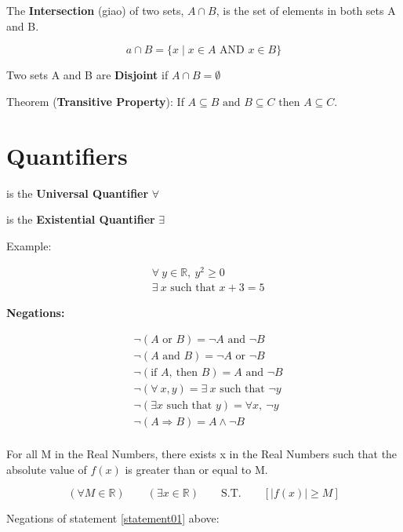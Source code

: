 The \textbf{Intersection} (giao) of two sets, $A \cap B$, is the set of elements in both sets A and B.

\[a \cap B = \{ x \mid x\in A \text{ AND } x\in B \}\]

Two sets A and B are \textbf{Disjoint} if $A \cap B = \emptyset$

Theorem (\textbf{Transitive Property}): If $A \subseteq B \text{ and } B \subseteq C \text{ then } A \subseteq C$.

\section{Quantifiers}

 is the \textbf{Universal Quantifier} $\forall$

 is the \textbf{Existential Quantifier} $\exists$

Example:

\[
  \begin{aligned}
    &\forall\ y \in \mathbb{R},\ y^{2} \geq 0\\
    &\exists\ x \text{ such that } x+3=5
  \end{aligned}
\]

\textbf{Negations:}

\[
\begin{aligned}
  &\neg(A \text{ or } B) = \neg A \text{ and } \neg B\\
  &\neg(A \text{ and } B)= \neg A \text{ or } \neg B\\
  &\neg(\text{if } A,\ \text{then } B) = A \text{ and } \neg B\\
  &\neg (\forall\ x,y)= \exists\ x \text{ such that } \neg y\\
  &\neg (\exists x \text{ such that } y)= \forall x,\ \neg y\\
  &\neg (A \Longrightarrow B) = A \wedge \neg B\\
\end{aligned}
\]

For all M in the Real Numbers, there exists x in the Real Numbers such that the absolute value of $f(x)$ is greater than or equal to M.

\begin{equation}
  (\forall M \in \mathbb{R})\qquad (\exists x \in \mathbb{R})\qquad  \text{S.T.}\qquad  [|f(x)| \geq M]
  \label{statement01}
\end{equation}

Negations of statement \ref{statement01} above:

